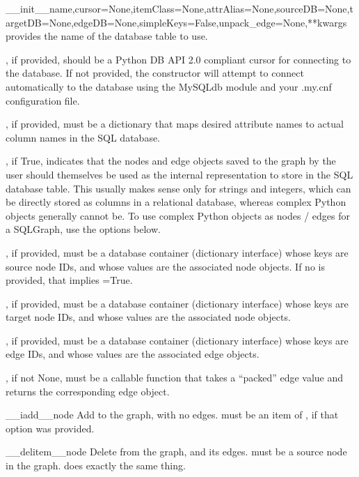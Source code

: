 \documentclass{howto}
\begin{document}
\begin{funcdesc}{__init__}{name,cursor=None,itemClass=None,attrAlias=None,sourceDB=None,targetDB=None,edgeDB=None,simpleKeys=False,unpack_edge=None,**kwargs}
   provides the name of the database table to use.

  , if provided, should be a Python DB API 2.0 compliant cursor
  for connecting to the database.  If not provided, the constructor will attempt
  to connect automatically to the database using the MySQLdb module and
  your .my.cnf configuration file.

  , if provided, must be a dictionary that maps desired
  attribute names to actual column names in the SQL database.

  , if True, indicates that the nodes and edge objects saved to
  the graph by the user should themselves be used as the internal representation
  to store in the SQL database table.  This usually makes sense only for strings
  and integers, which can be directly stored as columns in a relational database,
  whereas complex Python objects generally cannot be.  To use complex Python objects
  as nodes / edges for a SQLGraph, use the  options below.

  , if provided, must be a database container (dictionary interface) whose
  keys are source node IDs, and whose values are the associated node objects.
  If no  is provided, that implies =True.

  , if provided, must be a database container (dictionary interface) whose
  keys are target node IDs, and whose values are the associated node objects.

  , if provided, must be a database container (dictionary interface) whose
  keys are edge IDs, and whose values are the associated edge objects.

  , if not None, must be a callable function that takes a ``packed''
  edge value and returns the corresponding edge object.
\end{funcdesc}

\begin{funcdesc}{__iadd__}{node}
  Add  to the graph, with no edges.   must be 
  an item of , if that option was provided.
\end{funcdesc}

\begin{funcdesc}{__delitem__}{node}
  Delete  from the graph, and its edges.   must be a
  source node in the graph.   does exactly the same thing.
\end{funcdesc}
\end{document}

